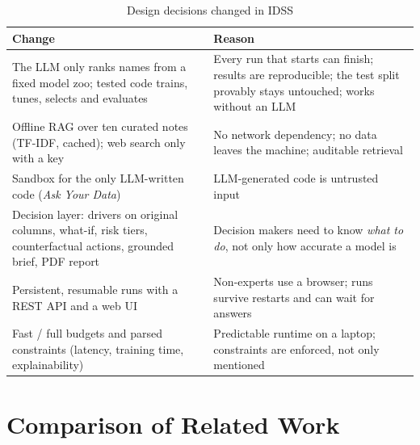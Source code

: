 \begin{table}[H]
\centering
\linespread{1}\small
\setlength{\tabcolsep}{4pt}
\caption{Design decisions changed in IDSS}\label{tab:2.3}
\begin{tabular}{|>{\raggedright\arraybackslash\hspace{0pt}}p{}|>{\raggedright\arraybackslash\hspace{0pt}}p{}|}
\hline
\rowcolor{tableheader}\textbf{Change} & \textbf{Reason} \\
\hline
The LLM only ranks names from a fixed model zoo; tested code trains, tunes, selects and evaluates & Every run that starts can finish; results are reproducible; the test split provably stays untouched; works without an LLM \\ \hline
Offline RAG over ten curated notes (TF-IDF, cached); web search only with a key & No network dependency; no data leaves the machine; auditable retrieval \\ \hline
Sandbox for the only LLM-written code (\textit{Ask Your Data}) & LLM-generated code is untrusted input \\ \hline
Decision layer: drivers on original columns, what-if, risk tiers, counterfactual actions, grounded brief, PDF report & Decision makers need to know \textit{what to do}, not only how accurate a model is \\ \hline
Persistent, resumable runs with a REST API and a web UI & Non-experts use a browser; runs survive restarts and can wait for answers \\ \hline
Fast / full budgets and parsed constraints (latency, training time, explainability) & Predictable runtime on a laptop; constraints are enforced, not only mentioned \\ \hline
\end{tabular}
\end{table}

\FloatBarrier
\section{Comparison of Related Work}\label{sec:2.8}

